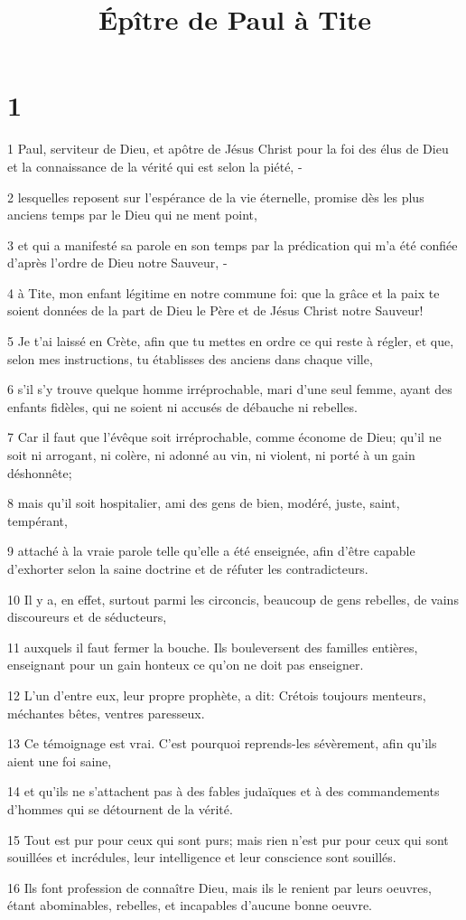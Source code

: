 

\title{Épître de Paul à Tite}


\chapter{1}

\par 1 Paul, serviteur de Dieu, et apôtre de Jésus Christ pour la foi des élus de Dieu et la connaissance de la vérité qui est selon la piété, -
\par 2 lesquelles reposent sur l'espérance de la vie éternelle, promise dès les plus anciens temps par le Dieu qui ne ment point,
\par 3 et qui a manifesté sa parole en son temps par la prédication qui m'a été confiée d'après l'ordre de Dieu notre Sauveur, -
\par 4 à Tite, mon enfant légitime en notre commune foi: que la grâce et la paix te soient données de la part de Dieu le Père et de Jésus Christ notre Sauveur!
\par 5 Je t'ai laissé en Crète, afin que tu mettes en ordre ce qui reste à régler, et que, selon mes instructions, tu établisses des anciens dans chaque ville,
\par 6 s'il s'y trouve quelque homme irréprochable, mari d'une seul femme, ayant des enfants fidèles, qui ne soient ni accusés de débauche ni rebelles.
\par 7 Car il faut que l'évêque soit irréprochable, comme économe de Dieu; qu'il ne soit ni arrogant, ni colère, ni adonné au vin, ni violent, ni porté à un gain déshonnête;
\par 8 mais qu'il soit hospitalier, ami des gens de bien, modéré, juste, saint, tempérant,
\par 9 attaché à la vraie parole telle qu'elle a été enseignée, afin d'être capable d'exhorter selon la saine doctrine et de réfuter les contradicteurs.
\par 10 Il y a, en effet, surtout parmi les circoncis, beaucoup de gens rebelles, de vains discoureurs et de séducteurs,
\par 11 auxquels il faut fermer la bouche. Ils bouleversent des familles entières, enseignant pour un gain honteux ce qu'on ne doit pas enseigner.
\par 12 L'un d'entre eux, leur propre prophète, a dit: Crétois toujours menteurs, méchantes bêtes, ventres paresseux.
\par 13 Ce témoignage est vrai. C'est pourquoi reprends-les sévèrement, afin qu'ils aient une foi saine,
\par 14 et qu'ils ne s'attachent pas à des fables judaïques et à des commandements d'hommes qui se détournent de la vérité.
\par 15 Tout est pur pour ceux qui sont purs; mais rien n'est pur pour ceux qui sont souillées et incrédules, leur intelligence et leur conscience sont souillés.
\par 16 Ils font profession de connaître Dieu, mais ils le renient par leurs oeuvres, étant abominables, rebelles, et incapables d'aucune bonne oeuvre.

